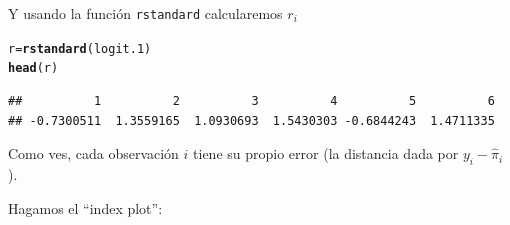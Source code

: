 \documentclass[onesided]{article}\usepackage[]{graphicx}\usepackage[]{color}
\makeatletter
\newcommand{\hlstd}[1]{\textcolor[rgb]{0.345,0.345,0.345}{#1}}%
\newcommand{\hlkwb}[1]{\textcolor[rgb]{0.69,0.353,0.396}{#1}}%
\newcommand{\hlkwd}[1]{\textcolor[rgb]{0.737,0.353,0.396}{\textbf{#1}}}%
\newenvironment{kframe}{%
 \def\at@end@of@kframe{}%
 \ifinner\ifhmode%
  \def\at@end@of@kframe{\end{minipage}}%
  \begin{minipage}{\columnwidth}%
 \fi\fi%
 \def\FrameCommand##1{\hskip\@totalleftmargin \hskip-\fboxsep
 \colorbox{shadecolor}{##1}\hskip-\fboxsep
     \hskip-\linewidth \hskip-\@totalleftmargin \hskip\columnwidth}%
 \MakeFramed {\advance\hsize-\width
   \@totalleftmargin\z@ \linewidth\hsize
   \@setminipage}}%
 {\par\unskip\endMakeFramed%
 \at@end@of@kframe}
\newenvironment{knitrout}{}{} %
\makeatother
\begin{document}
Y usando la funci\'on \texttt{rstandard} calcularemos $r_{i}$

\begin{knitrout}
\color{fgcolor}\begin{kframe}
\begin{alltt}
\hlstd{r} \hlkwb{=} \hlkwd{rstandard}\hlstd{(logit.1)}
\hlkwd{head}\hlstd{(r)}
\end{alltt}
\begin{verbatim}
##          1          2          3          4          5          6 
## -0.7300511  1.3559165  1.0930693  1.5430303 -0.6844243  1.4711335
\end{verbatim}
\end{kframe}
\end{knitrout}

Como ves, cada observaci\'on $i$ tiene su propio error (la distancia dada por $y_{i}-\hat \pi_{i}$). 

Hagamos el ``index plot'':
\end{document}
